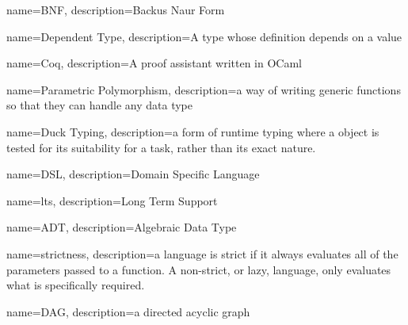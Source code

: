 {%
    name=BNF,
    description={Backus Naur Form}
}

{%
    name={Dependent Type},
    description={A type whose definition depends on a value}
}

{%
    name=Coq,
    description={A proof assistant written in OCaml}
}

{%
    name={Parametric Polymorphism},
    description={a way of writing generic functions so that they can handle any data type}
}

{%
    name={Duck Typing},
    description={a form of runtime typing where a object is tested for its suitability for a task,
    rather than its exact nature.}
}

{%
    name={DSL},
    description={Domain Specific Language}
}

{%
    name={lts},
    description={Long Term Support}
}

{%
    name={ADT},
    description={Algebraic Data Type}
}

{%
    name={strictness},
    description={a language is strict if it always evaluates all of the parameters passed to a
    function. A non-strict, or lazy, language, only evaluates what is specifically required.}
}

{%
    name={DAG},
    description={a directed acyclic graph}
}
